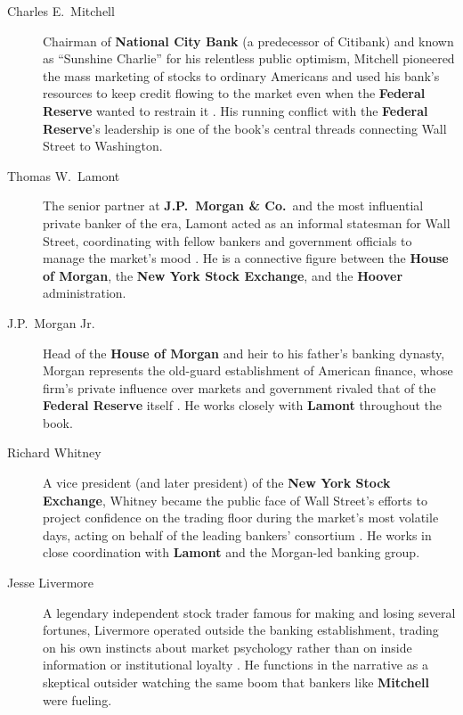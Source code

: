\documentclass[11pt]{article}
\newcommand{\charname}[1]{\textbf{#1}}
\begin{document}
\begin{description}

\item[Charles E.\ Mitchell] Chairman of \charname{National City Bank} (a
predecessor of Citibank) and known as ``Sunshine Charlie'' for his relentless
public optimism, Mitchell pioneered the mass marketing of stocks to ordinary
Americans and used his bank's resources to keep credit flowing to the market
even when the \charname{Federal Reserve} wanted to restrain it
\autocite{airmail1929,supersummary1929}. His running conflict with the
\charname{Federal Reserve}'s leadership is one of the book's central threads
connecting Wall Street to Washington.

\item[Thomas W.\ Lamont] The senior partner at \charname{J.P.\ Morgan \& Co.}\
and the most influential private banker of the era, Lamont acted as an informal
statesman for Wall Street, coordinating with fellow bankers and government
officials to manage the market's mood \autocite{supersummary1929,
dailyeconomy1929}. He is a connective figure between the \charname{House of
Morgan}, the \charname{New York Stock Exchange}, and the \charname{Hoover}
administration.

\item[J.P.\ Morgan Jr.] Head of the \charname{House of Morgan} and heir to his
father's banking dynasty, Morgan represents the old-guard establishment of
American finance, whose firm's private influence over markets and government
rivaled that of the \charname{Federal Reserve} itself
\autocite{supersummary1929}. He works closely with \charname{Lamont} throughout
the book.

\item[Richard Whitney] A vice president (and later president) of the
\charname{New York Stock Exchange}, Whitney became the public face of Wall
Street's efforts to project confidence on the trading floor during the
market's most volatile days, acting on behalf of the leading bankers'
consortium \autocite{supersummary1929,csmonitor1929}. He works in close
coordination with \charname{Lamont} and the Morgan-led banking group.

\item[Jesse Livermore] A legendary independent stock trader famous for making
and losing several fortunes, Livermore operated outside the banking
establishment, trading on his own instincts about market psychology rather than
on inside information or institutional loyalty \autocite{airmail1929,
supersummary1929}. He functions in the narrative as a skeptical outsider
watching the same boom that bankers like \charname{Mitchell} were fueling.


\end{description}
\end{document}
